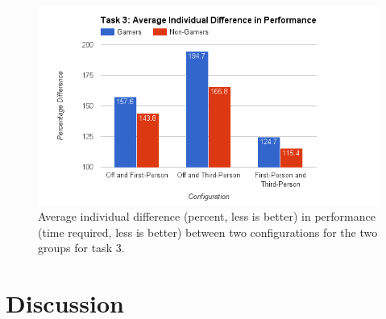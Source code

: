 \documentclass[runningheads,a4paper,oribibl]{llncs}
\begin{document}
\begin{figure}
   \centering
   \includegraphics[width=\textwidth]{ExternalMaterial/Task3GraphD}
   \caption{Average individual difference (percent, less is better) in performance (time required, less is better) between two configurations for the two groups for task 3.} \label{fig:Task3GraphD}
\end{figure}
























\section{Discussion} \label{sec:Discussion}
\end{document}
